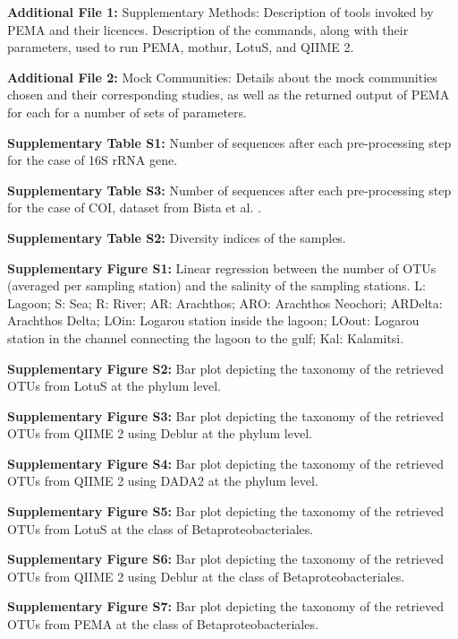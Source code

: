       \textbf{Additional File 1:} Supplementary Methods: Description of tools invoked by PEMA and their licences. Description of the commands, along with their parameters, used to run PEMA, mothur, LotuS, and QIIME 2.

      \textbf{Additional File 2:} Mock Communities: Details about the mock communities chosen and their corresponding studies, as well as the returned output of PEMA for each for a number of sets of parameters.

      \textbf{Supplementary Table S1:} Number of sequences after each pre-processing step for the case of 16S rRNA gene.

      \textbf{Supplementary Table S3:} Number of sequences after each pre-processing step for the case of COI, dataset from Bista et al. \cite{bista2017annual}.

      \textbf{Supplementary Table S2:} Diversity indices of the samples.

      \textbf{Supplementary Figure S1:} Linear regression between the number of OTUs (averaged per sampling station) and the salinity of the sampling stations. L: Lagoon; S: Sea; R: River; AR: Arachthos; ARO: Arachthos Neochori; ARDelta: Arachthos Delta; LOin: Logarou station inside the lagoon; LOout: Logarou station in the channel connecting the lagoon to the gulf; Kal: Kalamitsi.

      \textbf{Supplementary Figure S2:} Bar plot depicting the taxonomy of the retrieved OTUs from LotuS at the phylum level.

      \textbf{Supplementary Figure S3:} Bar plot depicting the taxonomy of the retrieved OTUs from QIIME 2 using Deblur at the phylum level.

      \textbf{Supplementary Figure S4:} Bar plot depicting the taxonomy of the retrieved OTUs from QIIME 2 using DADA2 at the phylum level.

      \textbf{Supplementary Figure S5:} Bar plot depicting the taxonomy of the retrieved OTUs from LotuS at the class of Betaproteobacteriales.

      \textbf{Supplementary Figure S6:} Bar plot depicting the taxonomy of the retrieved OTUs from QIIME 2 using Deblur at the class of Betaproteobacteriales.

      \textbf{Supplementary Figure S7:} Bar plot depicting the taxonomy of the retrieved OTUs from PEMA at the class of Betaproteobacteriales.
   \fi
   \newpage


% 
% 

